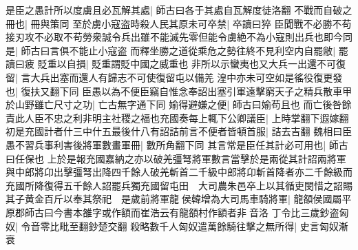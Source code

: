 是臣之愚計所以度虜且必瓦解其處|{
	師古曰各于其處自瓦解度徒洛翻}
不戰而自破之冊也|{
	冊與策同}
至於虜小寇盗時殺人民其原未可卒禁|{
	卒讀曰猝}
臣聞戰不必勝不苟接刃攻不必取不苟勞衆誠令兵出雖不能滅先零但能令虜絶不為小寇則出兵也即今同是|{
	師古曰言俱不能止小寇盗}
而釋坐勝之道從乘危之勢往終不見利空内自罷敝|{
	罷讀曰疲}
貶重以自損|{
	貶重謂貶中國之威重也}
非所以示蠻夷也又大兵一出還不可復留|{
	言大兵出塞而還人有歸志不可使復留屯以備羌}
湟中亦未可空如是徭役復更發也|{
	復扶又翻下同}
臣愚以為不便臣竊自惟念奉詔出塞引軍遠擊窮天子之精兵散車甲於山野雖亡尺寸之功|{
	亡古無字通下同}
媮得避嫌之便|{
	師古曰媮苟且也}
而亡後咎餘責此人臣不忠之利非明主社稷之福也充國奏每上輒下公卿議臣|{
	上時掌翻下遐嫁翻}
初是充國計者什三中什五最後什八有詔詰前言不便者皆頓首服|{
	詰去吉翻}
魏相曰臣愚不習兵事利害後將軍數畫軍冊|{
	數所角翻下同}
其言常是臣任其計必可用也|{
	師古曰任保也}
上於是報充國嘉納之亦以破羌彊弩將軍數言當擊於是兩從其計詔兩將軍與中郎將卬出擊彊弩出降四千餘人破羌斬首二千級中郎將卬斬首降者亦二千餘級而充國所降復得五千餘人詔罷兵獨充國留屯田　大司農朱邑卒上以其循吏閔惜之詔賜其子黄金百斤以奉其祭祀　是歲前將軍龍侯韓增為大司馬車騎將軍|{
	龍頟侯國屬平原郡師古曰今書本雒字或作額而崔浩云有龍頟村作額者非音洛}
丁令比三歲鈔盗匈奴|{
	令音零比毗至翻鈔楚交翻}
殺略數千人匈奴遣萬餘騎往擊之無所得|{
	史言匈奴漸衰}


